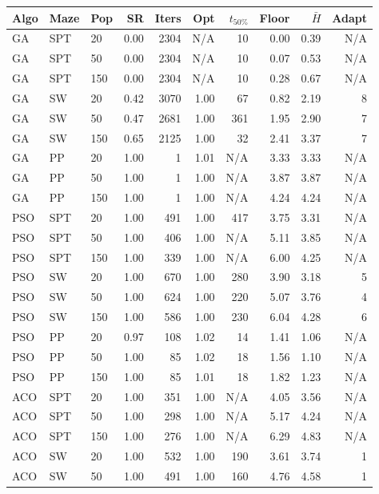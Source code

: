 \begin{table}[ht]
\centering
\small
\begin{tabular}{lllrrrrrrr}
\toprule
Algo & Maze & Pop & SR & Iters & Opt & $t_{50\%}$ & Floor & $\bar{H}$ & Adapt \\
\midrule
GA & SPT & 20 & 0.00 & 2304 & N/A & 10 & 0.00 & 0.39 & N/A \\
GA & SPT & 50 & 0.00 & 2304 & N/A & 10 & 0.07 & 0.53 & N/A \\
GA & SPT & 150 & 0.00 & 2304 & N/A & 10 & 0.28 & 0.67 & N/A \\
GA & SW & 20 & 0.42 & 3070 & 1.00 & 67 & 0.82 & 2.19 & 8 \\
GA & SW & 50 & 0.47 & 2681 & 1.00 & 361 & 1.95 & 2.90 & 7 \\
GA & SW & 150 & 0.65 & 2125 & 1.00 & 32 & 2.41 & 3.37 & 7 \\
GA & PP & 20 & 1.00 & 1 & 1.01 & N/A & 3.33 & 3.33 & N/A \\
GA & PP & 50 & 1.00 & 1 & 1.00 & N/A & 3.87 & 3.87 & N/A \\
GA & PP & 150 & 1.00 & 1 & 1.00 & N/A & 4.24 & 4.24 & N/A \\
PSO & SPT & 20 & 1.00 & 491 & 1.00 & 417 & 3.75 & 3.31 & N/A \\
PSO & SPT & 50 & 1.00 & 406 & 1.00 & N/A & 5.11 & 3.85 & N/A \\
PSO & SPT & 150 & 1.00 & 339 & 1.00 & N/A & 6.00 & 4.25 & N/A \\
PSO & SW & 20 & 1.00 & 670 & 1.00 & 280 & 3.90 & 3.18 & 5 \\
PSO & SW & 50 & 1.00 & 624 & 1.00 & 220 & 5.07 & 3.76 & 4 \\
PSO & SW & 150 & 1.00 & 586 & 1.00 & 230 & 6.04 & 4.28 & 6 \\
PSO & PP & 20 & 0.97 & 108 & 1.02 & 14 & 1.41 & 1.06 & N/A \\
PSO & PP & 50 & 1.00 & 85 & 1.02 & 18 & 1.56 & 1.10 & N/A \\
PSO & PP & 150 & 1.00 & 85 & 1.01 & 18 & 1.82 & 1.23 & N/A \\
ACO & SPT & 20 & 1.00 & 351 & 1.00 & N/A & 4.05 & 3.56 & N/A \\
ACO & SPT & 50 & 1.00 & 298 & 1.00 & N/A & 5.17 & 4.24 & N/A \\
ACO & SPT & 150 & 1.00 & 276 & 1.00 & N/A & 6.29 & 4.83 & N/A \\
ACO & SW & 20 & 1.00 & 532 & 1.00 & 190 & 3.61 & 3.74 & 1 \\
ACO & SW & 50 & 1.00 & 491 & 1.00 & 160 & 4.76 & 4.58 & 1 \\

\end{tabular}
\end{table}
